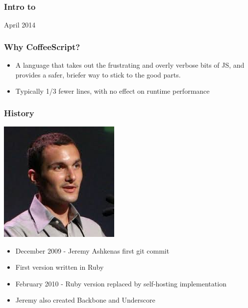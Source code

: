 \documentclass{beamer}
\begin{document}
\begin{frame}
  \frametitle{Intro to}

  April 2014

\end{frame}

\begin{frame}
  \frametitle{Why CoffeeScript?}
  \begin{itemize}
    \pause
    \item A language that takes out the frustrating and overly verbose bits of JS, and provides a safer, briefer way to stick to the good parts.
      \pause
    \item  Typically 1/3 fewer lines, with no effect on runtime performance
  \end{itemize}
\end{frame}

\begin{frame}
  \frametitle{History}
  \includegraphics[scale=.60]{jeremy}  
  \begin{itemize}
    \item December 2009 - Jeremy Ashkenas first git commit
      \pause
    \item First version written in Ruby
      \pause
    \item February 2010 - Ruby version replaced by self-hosting
      implementation
      \pause
    \item Jeremy also created Backbone and Underscore
  \end{itemize}  
\end{frame}
\end{document}
